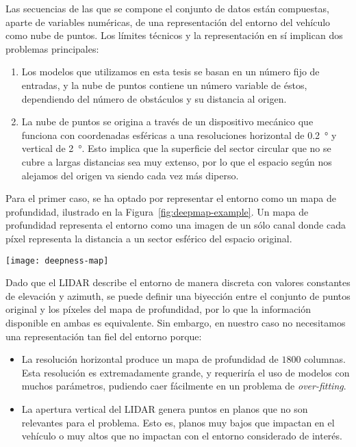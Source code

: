 Las secuencias de las que se compone el conjunto de datos están compuestas, aparte de variables numéricas, de una representación del entorno del vehículo como nube de puntos. Los límites técnicos y la representación en sí implican dos problemas principales:

\begin{enumerate}
	\item Los modelos que utilizamos en esta tesis se basan en un número fijo de entradas, y la nube de puntos contiene un número variable de éstos, dependiendo del número de obstáculos y su distancia al origen.
	\item La nube de puntos se origina a través de un dispositivo mecánico que funciona con coordenadas esféricas a una resoluciones horizontal de \SI{0.2}{\degree} y vertical de \SI{2}{\degree}. Esto implica que la superficie del sector circular que no se cubre a largas distancias sea muy extenso, por lo que el espacio según nos alejamos del origen va siendo cada vez más diperso.
\end{enumerate}

Para el primer caso, se ha optado por representar el entorno como un mapa de profundidad, ilustrado en la Figura~\ref{fig:deepmap-example}. Un mapa de profundidad representa el entorno como una imagen de un sólo canal donde cada píxel representa la distancia a un sector esférico del espacio original.

\begin{figure*}
	\centering
	\texttt{[image: deepness-map]}
	\caption[Ejemplo de un mapa de profundidad]{Un ejemplo del mapa de profundidad asociado a la nube de puntos original.}
	\label{fig:deepmap-example}
\end{figure*}


Dado que el LIDAR describe el entorno de manera discreta con valores constantes de elevación y azimuth, se puede definir una biyección entre el conjunto de puntos original y los píxeles del mapa de profundidad, por lo que la información disponible en ambas es equivalente. Sin embargo, en nuestro caso no necesitamos una representación tan fiel del entorno porque:

\begin{itemize}
	\item La resolución horizontal produce un mapa de profundidad de $1800$ columnas. Esta resolución es extremadamente grande, y requeriría el uso de modelos con muchos parámetros, pudiendo caer fácilmente en un problema de \textit{over-fitting}.
	\item La apertura vertical del LIDAR genera puntos en planos que no son relevantes para el problema. Esto es, planos muy bajos que impactan en el vehículo o muy altos que no impactan con el entorno considerado de interés.
\end{itemize}

